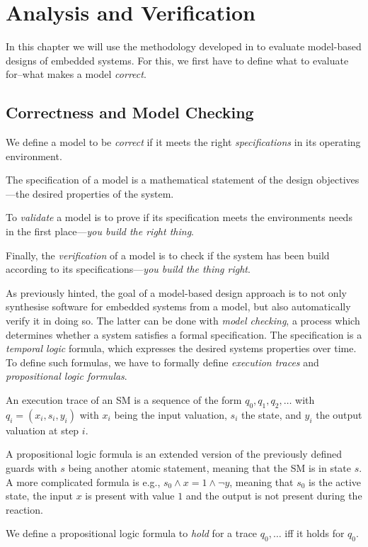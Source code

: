 \chapter{Analysis and Verification}
In this chapter we will use the methodology developed in  to evaluate model-based designs of embedded systems.
For this, we first have to define what to evaluate for--what makes a model \emph{correct}.

\section{Correctness and Model Checking}

\begin{definition}
    We define a model to be \emph{correct} if it meets the right \emph{specifications} in its operating environment.

    The specification of a model is a mathematical statement of the design objectives---the desired properties of the system.

    To \emph{validate} a model is to prove if its specification meets the environments needs in the first place---\emph{you build the right thing}.

    Finally, the \emph{verification} of a model is to check if the system has been build according to its specifications---\emph{you build the thing right}.
\end{definition}

As previously hinted, the goal of a model-based design approach is to not only synthesise software for embedded systems from a model, but also automatically verify it in doing so.
The latter can be done with \emph{model checking}, a process which determines whether a system satisfies a formal specification.
The specification is a \emph{temporal logic} formula, which expresses the desired systems properties over time.
To define such formulas, we have to formally define \emph{execution traces} and \emph{propositional logic formulas}.

\begin{definition}
    An execution trace of an SM is a sequence of the form \(q_0, q_1, q_2, \dots\) with \(q_i = (x_i, s_i, y_i)\) with \(x_i\) being the input valuation, \(s_i\) the state, and \(y_i\) the output valuation at step \(i\).

    A propositional logic formula is an extended version of the previously defined guards with \(s\) being another atomic statement, meaning that the SM is in state \(s\).
    A more complicated formula is e.g., \(s_0 \wedge x = 1 \wedge \neg y\), meaning that \(s_0\) is the active state, the input \(x\) is present with value \(1\) and the output is not present during the reaction.

    We define a propositional logic formula to \emph{hold} for a trace \(q_0, \dots\) iff it holds for \(q_0\).
\end{definition}

